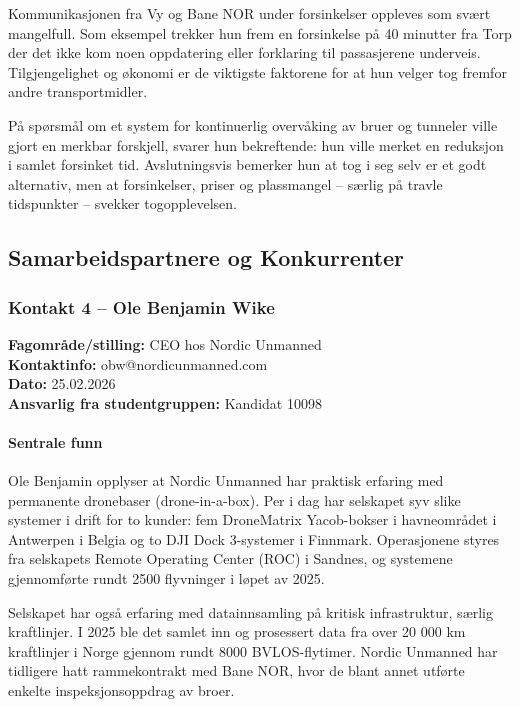 Kommunikasjonen fra Vy og Bane NOR under forsinkelser oppleves som svært mangelfull. Som eksempel trekker hun frem en forsinkelse på 40 minutter fra Torp der det ikke kom noen oppdatering eller forklaring til passasjerene underveis. Tilgjengelighet og økonomi er de viktigste faktorene for at hun velger tog fremfor andre transportmidler.

På spørsmål om et system for kontinuerlig overvåking av bruer og tunneler ville gjort en merkbar forskjell, svarer hun bekreftende: hun ville merket en reduksjon i samlet forsinket tid. Avslutningsvis bemerker hun at tog i seg selv er et godt alternativ, men at forsinkelser, priser og plassmangel – særlig på travle tidspunkter – svekker togopplevelsen.

\subsection{Samarbeidspartnere og Konkurrenter}

\subsubsection{Kontakt 4  – Ole Benjamin Wike}
\label{kontakt:wike}

\textbf{Fagområde/stilling:} CEO hos Nordic Unmanned \\
\textbf{Kontaktinfo:} obw@nordicunmanned.com \\
\textbf{Dato:} 25.02.2026 \\
\textbf{Ansvarlig fra studentgruppen:} Kandidat 10098

\paragraph{Sentrale funn} 

Ole Benjamin opplyser at Nordic Unmanned har praktisk erfaring med permanente dronebaser (drone-in-a-box). Per i dag har selskapet syv slike systemer i drift for to kunder: fem DroneMatrix Yacob-bokser i havneområdet i Antwerpen i Belgia og to DJI Dock 3-systemer i Finnmark. Operasjonene styres fra selskapets Remote Operating Center (ROC) i Sandnes, og systemene gjennomførte rundt 2500 flyvninger i løpet av 2025. 

Selskapet har også erfaring med datainnsamling på kritisk infrastruktur, særlig kraftlinjer. I 2025 ble det samlet inn og prosessert data fra over 20 000 km kraftlinjer i Norge gjennom rundt 8000 BVLOS-flytimer. Nordic Unmanned har tidligere hatt rammekontrakt med Bane NOR, hvor de blant annet utførte enkelte inspeksjonsoppdrag av broer. 

